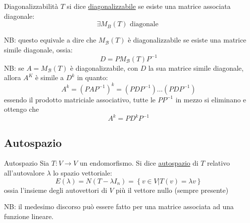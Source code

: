 \begin{definizione}{Diagonalizzabilità}
	$ T $ si dice \underline{diagonalizzabile} se esiste una matrice associata diagonale:
	\[
		\exists M_B \left( T \right) \text{ diagonale }
	\]
\end{definizione}
NB: questo equivale a dire che $ M_{ \mathcal{B}}(T) $ è diagonalizzabile se esiste una matrice simile diagonale, ossia:
\[
	D = P M_{ \mathcal{B}}\left( T \right) P^{-1}
\]
NB: se $ A = M_{ \mathcal{B}}\left( T \right) $ è diagonalizzabile, con $ D $ la sua matrice simile diagonale, allora $ A^{K} $ è simile a $ D^{k} $ in quanto:
\[
	A^{k}= \left( P A P^{-1} \right) ^{k} = \left( P D P^{-1} \right)\ldots \left( P D P^{-1} \right)
\]
essendo il prodotto matriciale associativo, tutte le $ PP^{-1} $ in mezzo si eliminano e ottengo che
\[
	A^{k}= P D^{k}P^{-1}
\]
\subsection{Autospazio}
\begin{definizione}{Autospazio}
	Sia $ T : V \to V $ un endomorfismo. Si dice \underline{autospazio} di $ T $ relativo all'autovalore $ \lambda  $ lo spazio vettoriale:
	\[
		E\left( \lambda  \right) = N\left( T- \lambda I_{n} \right) = \left\{ v \in  V| T\left( v \right) = \lambda  v \right\}
	\]
	ossia l'insieme degli autovettori di $ V $ più il vettore nullo (sempre presente)
\end{definizione}
NB: il medesimo discorso può essere fatto per una matrice associata ad una funzione lineare.
